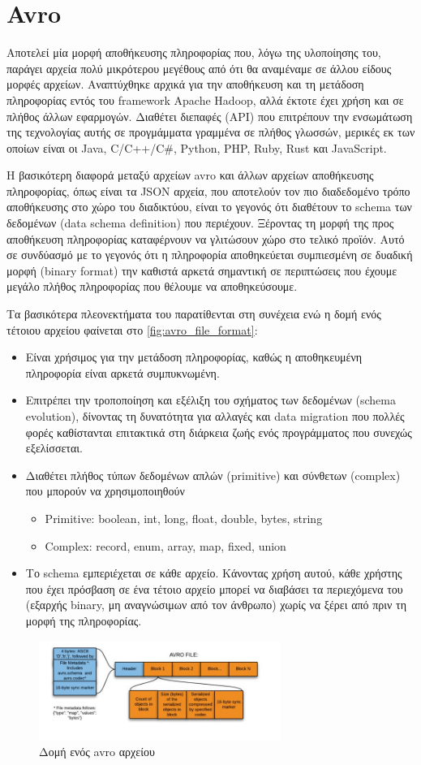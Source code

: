 
\section{Avro}
\label{section:avro}

Αποτελεί μία μορφή αποθήκευσης πληροφορίας που, λόγω της υλοποίησης του, παράγει αρχεία
πολύ μικρότερου μεγέθους από ότι θα αναμέναμε σε άλλου είδους μορφές αρχείων. Αναπτύχθηκε αρχικά για
την αποθήκευση και τη μετάδοση πληροφορίας εντός του framework Apache Hadoop, αλλά έκτοτε
έχει χρήση και σε πλήθος άλλων εφαρμογών. Διαθέτει διεπαφές (API) που επιτρέπουν την ενσωμάτωση της τεχνολογίας αυτής σε
προγμάμματα γραμμένα σε πλήθος γλωσσών, μερικές εκ των οποίων είναι οι Java, C/C++/C\#, Python, PHP, Ruby, Rust και JavaScript.

Η βασικότερη διαφορά μεταξύ αρχείων avro και άλλων αρχείων αποθήκευσης πληροφορίας, όπως είναι τα JSON αρχεία,
που αποτελούν τον πιο διαδεδομένο τρόπο αποθήκευσης στο χώρο του διαδικτύου, είναι το γεγονός
ότι διαθέτουν το schema των δεδομένων (data schema definition) που περιέχουν. Ξέροντας τη μορφή της προς αποθήκευση πληροφορίας
καταφέρνουν να γλιτώσουν χώρο στο τελικό προϊόν. Αυτό σε συνδύασμό με το γεγονός ότι η πληροφορία αποθηκεύεται
συμπιεσμένη σε δυαδική μορφή (binary format) την καθιστά αρκετά σημαντική σε περιπτώσεις που έχουμε μεγάλο πλήθος πληροφορίας
που θέλουμε να αποθηκεύσουμε.

Τα βασικότερα πλεονεκτήματα του παρατίθενται στη συνέχεια ενώ η δομή ενός τέτοιου αρχείου φαίνεται στο \autoref{fig:avro_file_format}:

\begin{itemize}
	\item Είναι χρήσιμος για την μετάδοση πληροφορίας, καθώς η αποθηκευμένη πληροφορία είναι
		αρκετά συμπυκνωμένη.
	\item Επιτρέπει την τροποποίηση και εξέλιξη του σχήματος των δεδομένων (schema evolution), δίνοντας
		τη δυνατότητα για αλλαγές και data migration που πολλές φορές καθίστανται επιτακτικά 
		στη διάρκεια ζωής ενός προγράμματος που συνεχώς εξελίσσεται.
	\item Διαθέτει πλήθος τύπων δεδομένων απλών (primitive) και σύνθετων (complex) που μπορούν να χρησιμοποιηθούν
		\begin{itemize}
			\item Primitive: boolean, int, long, float, double, bytes, string
			\item Complex: record, enum, array, map, fixed, union 
		\end{itemize}
	\item Το schema εμπεριέχεται σε κάθε αρχείο. Κάνοντας χρήση αυτού, κάθε χρήστης που έχει
		πρόσβαση σε ένα τέτοιο αρχείο μπορεί να διαβάσει τα περιεχόμενα του (εξαρχής binary, μη αναγνώσιμων από τον άνθρωπο)
		χωρίς να ξέρει από πριν τη μορφή της πληροφορίας. 
\end{itemize}


\begin{figure}[!ht]
	\centering
	\includegraphics[width=0.7\textwidth]{./images/chapter2/avro_file_format.png}
	\caption[Δομή ενός avro αρχείου]{Δομή ενός avro αρχείου}
	\label{fig:avro_file_format}
\end{figure}